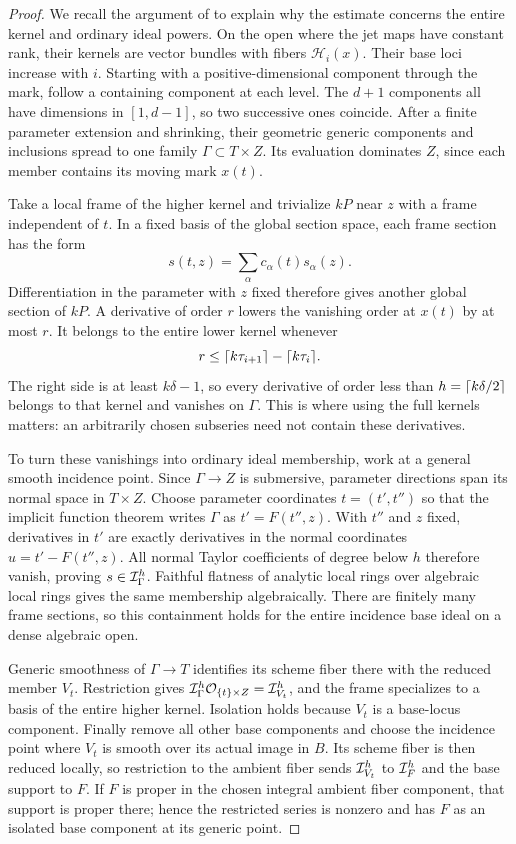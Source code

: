 \begin{proof}
We recall the argument of \cite[Lemmas~7.3--7.4]{OpenAIAbundance2026}
to explain why the estimate concerns the entire kernel and ordinary
ideal powers. On the open where the jet maps have constant rank,
their kernels are vector bundles with fibers $\mathcal H_i(x)$.
Their base loci increase with $i$. Starting with a positive-dimensional
component through the mark, follow a containing component at each
level. The $d+1$ components all have dimensions in $[1,d-1]$, so
two successive ones coincide. After a finite parameter extension
and shrinking, their geometric generic components and inclusions
spread to one family $\Gamma\subset T\times Z$. Its evaluation
dominates $Z$, since each member contains its moving mark $x(t)$.

Take a local frame of the higher kernel and trivialize $kP$ near
$z$ with a frame independent of $t$. In a fixed basis of the global
section space, each frame section has the form
\[
 s(t,z)=\sum_\alpha c_\alpha(t)s_\alpha(z).
\]
Differentiation in the parameter with $z$ fixed therefore gives
another global section of $kP$. A derivative of order $r$ lowers
the vanishing order at $x(t)$ by at most $r$. It belongs to the
entire lower kernel whenever
\[
 r\leq\lceil k\tau_{i+1}\rceil-\lceil k\tau_i\rceil.
\]
The right side is at least $k\delta-1$, so every derivative of
order less than $h=\lceil k\delta/2\rceil$ belongs to that kernel and
vanishes on $\Gamma$. This is where using the full kernels matters:
an arbitrarily chosen subseries need not contain these derivatives.

To turn these vanishings into ordinary ideal membership, work at a
general smooth incidence point. Since $\Gamma\to Z$ is submersive,
parameter directions span its normal space in $T\times Z$.
Choose parameter coordinates $t=(t',t'')$ so that the implicit
function theorem writes $\Gamma$ as $t'=F(t'',z)$. With $t''$ and
$z$ fixed, derivatives in $t'$ are exactly derivatives in the
normal coordinates $u=t'-F(t'',z)$. All normal Taylor coefficients
of degree below $h$ therefore vanish, proving
$s\in\mathcal I_\Gamma^h$. Faithful flatness of analytic local rings over
algebraic local rings gives the same membership algebraically.
There are finitely many frame sections, so this containment holds
for the entire incidence base ideal on a dense algebraic open.

Generic smoothness of $\Gamma\to T$ identifies its scheme fiber
there with the reduced member $V_t$. Restriction gives
$\mathcal I_\Gamma^h\mathcal O_{\{t\}\times Z}=\mathcal I_{V_t}^h$, and the frame
specializes to a basis of the entire higher kernel. Isolation
holds because $V_t$ is a base-locus component. Finally remove all
other base components and choose the incidence point where
$V_t$ is smooth over its actual image in $B$. Its scheme fiber is
then reduced locally, so restriction to the ambient fiber sends
$\mathcal I_{V_t}^h$ to $\mathcal I_F^h$ and the base support to $F$. If $F$
is proper in the chosen integral ambient fiber component, that
support is proper there; hence the restricted series is nonzero
and has $F$ as an isolated base component at its generic point.
\end{proof}


